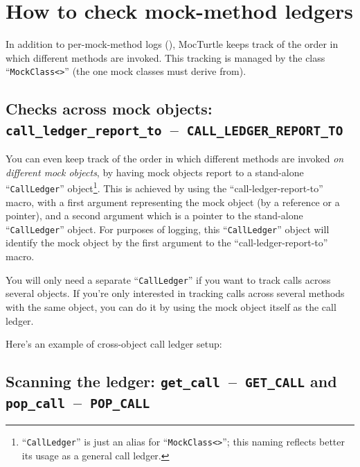 \documentclass[twoside, a4paper, article]{memoir}
\newcommand*\testudocolor{\color{red!80!blue}}
\newcommand*\testudo[1]{\texttt{\testudocolor{}#1}}
\newcommand*\testudopair[2]{\testudo{#1}~--~\testudo{#2}}
\newcommand\subsectiontestudopair[3]{%
  \subsection[#1]{#1: \testudopair{#2}{#3}}}
\providecommand\typesetexample[1]{%
}
\begin{document}
\section{How to check mock-method ledgers}
\label{sec:check-mock-method-ledgers}

In addition to per-mock-method logs (),
MocTurtle keeps track of the order in which different methods are invoked.
This tracking is managed by the class ``\texttt{MockClass<>}'' (the one mock
classes must derive from).

\subsectiontestudopair{Checks across mock objects}%
  {call\_ledger\_report\_to}{CALL\_LEDGER\_REPORT\_TO}
\label{sec:check-mock-method-ledgers-across-mock-objects}

You can even keep track of the order in which different methods are invoked
\emph{on different mock objects}, by having mock objects report to a
stand-alone ``\texttt{CallLedger}''
object\footnote{``\texttt{CallLedger}'' is just an alias for
  ``\texttt{MockClass<>}''; this naming reflects better its usage as a
  general call ledger.}.
This is achieved by using the ``call-ledger-report-to'' macro, with a first
argument representing the mock object (by a reference or a pointer), and a
second argument which is a pointer to the stand-alone ``\texttt{CallLedger}''
object.  For purposes of logging, this ``\texttt{CallLedger}'' object will
identify the mock object by the first argument to the ``call-ledger-report-to''
macro.

You will only need a separate ``\texttt{CallLedger}'' if you want to
track calls across several objects.  If you're only interested in tracking
calls across several methods with the same object, you can do it by using the
mock object itself as the call ledger.

Here's an example of cross-object call ledger setup:

\typesetexample{ledger-setup}

\subsection[Scanning the ledger]%
  {Scanning the ledger:
    \testudopair{get\_call}{GET\_CALL} and
    \testudopair{pop\_call}{POP\_CALL}}
\label{sec:scan-ledger}
\end{document}
